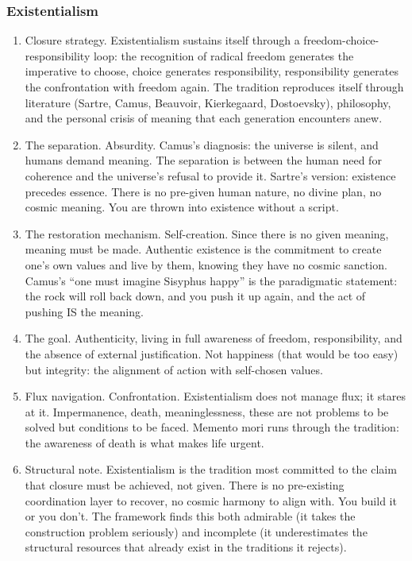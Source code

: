 \documentclass[
]{article}
\begin{document}
\subsubsection{Existentialism}\label{existentialism}

\begin{enumerate}
\def\labelenumi{\arabic{enumi}.}
\setcounter{enumi}{111}
\item
  Closure strategy. Existentialism sustains itself through a
  freedom-choice- responsibility loop: the recognition of radical
  freedom generates the imperative to choose, choice generates
  responsibility, responsibility generates the confrontation with
  freedom again. The tradition reproduces itself through literature
  (Sartre, Camus, Beauvoir, Kierkegaard, Dostoevsky), philosophy, and
  the personal crisis of meaning that each generation encounters anew.
\item
  The separation. Absurdity. Camus's diagnosis: the universe is silent,
  and humans demand meaning. The separation is between the human need
  for coherence and the universe's refusal to provide it. Sartre's
  version: existence precedes essence. There is no pre-given human
  nature, no divine plan, no cosmic meaning. You are thrown into
  existence without a script.
\item
  The restoration mechanism. Self-creation. Since there is no given
  meaning, meaning must be made. Authentic existence is the commitment
  to create one's own values and live by them, knowing they have no
  cosmic sanction. Camus's ``one must imagine Sisyphus happy'' is the
  paradigmatic statement: the rock will roll back down, and you push it
  up again, and the act of pushing IS the meaning.
\item
  The goal. Authenticity, living in full awareness of freedom,
  responsibility, and the absence of external justification. Not
  happiness (that would be too easy) but integrity: the alignment of
  action with self-chosen values.
\item
  Flux navigation. Confrontation. Existentialism does not manage flux;
  it stares at it. Impermanence, death, meaninglessness, these are not
  problems to be solved but conditions to be faced. Memento mori runs
  through the tradition: the awareness of death is what makes life
  urgent.
\item
  Structural note. Existentialism is the tradition most committed to the
  claim that closure must be achieved, not given. There is no
  pre-existing coordination layer to recover, no cosmic harmony to align
  with. You build it or you don't. The framework finds this both
  admirable (it takes the construction problem seriously) and incomplete
  (it underestimates the structural resources that already exist in the
  traditions it rejects).
\end{enumerate}
\end{document}
